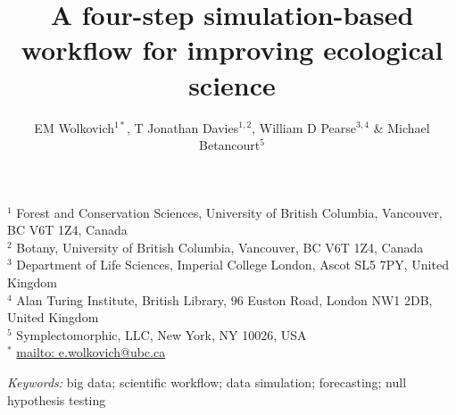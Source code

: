\documentclass[11pt]{article}
\begin{document}

\renewcommand{\refname}{\CHead{}}


\title{A four-step simulation-based workflow for improving ecological science}
\author{EM Wolkovich$^{1*}$, T Jonathan Davies$^{1,2}$, William D Pearse$^{3,4}$ \& Michael Betancourt$^{5}$}
\maketitle

\noindent $^{1}$ Forest and Conservation Sciences, University of British Columbia, Vancouver, BC V6T 1Z4, Canada\\
$^{2}$ Botany, University of British Columbia, Vancouver, BC V6T 1Z4, Canada\\
$^{3}$ Department of Life Sciences, Imperial College London, Ascot SL5 7PY, United Kingdom \\
$^{4}$ Alan Turing Institute, British Library, 96 Euston Road, London NW1 2DB, United Kingdom \\
$^{5}$ Symplectomorphic, LLC, New York, NY 10026, USA \\
$^{*}$ \url{mailto: e.wolkovich@ubc.ca}
 
\vspace{3ex}
\noindent \emph{Keywords:} big data; scientific workflow; data simulation; forecasting; null hypothesis testing
\vspace{3ex}
\end{document}

